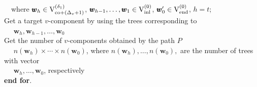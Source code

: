 \documentclass[12pt]{article}
\newcommand{\co}{\mathrm{co}}
\newcommand{\V}{{\rm V}}
\newcommand{\w}{\pmb{w}}
\newcommand{\1}{\pmb{1}}
\newcommand{\0}{\pmb{0}}
\newcommand{\inl}{\mathrm{inl}}
\newcommand{\en}{\mathrm{end}}
\begin{document}
\begin{tabbing}
~~where 
$\w_h \in \V_{\co+(\Delta_v + 1)}^{(\delta_1)}$, 
$\w_{h-1}, \ldots, \w_{1}\in 
\V_{\inl}^{(0)}$,
$\w'_0 \in \V_{\en}^{(0)} $, $h = t$;\\
Get a target $v$-component by using the trees 
corresponding to\\
~~ $\w_h, \w_{h-1}, \ldots, \w_0 $\\
Get the number of $v$-components obtained by the path 
$P$ \\
~~ $n(\w_h)\times \cdots \times n(\w_0)$, where 
$n(\w_h), \ldots, n(\w_0),$ 
are the number of trees with vector \\
~~ $\w_h, \ldots, \w_0$, respectively\- \\
{\bf end for}.
\end{tabbing}



% 
% 
\end{document}
